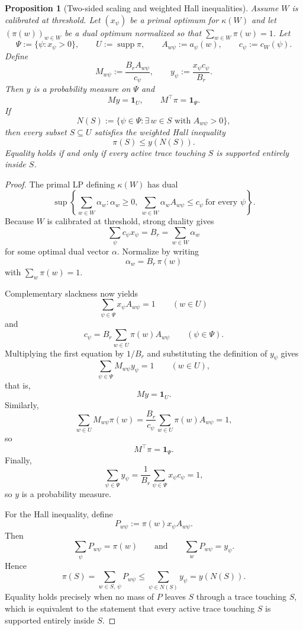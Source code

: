 \documentclass[11pt]{article}
\newtheorem{proposition}[theorem]{Proposition}
\theoremstyle{definition}
\newcommand{\supp}{\operatorname{supp}}
\newcommand{\1}{\mathbf{1}}
\begin{document}
\begin{proposition}[Two-sided scaling and weighted Hall inequalities]\label{prop:calibrated-blocker-scaling}
Assume $W$ is calibrated at threshold. Let $(x_\psi)$ be a primal optimum for $\kappa(W)$ and let $(\pi(w))_{w\in W}$ be a dual optimum normalized so that $\sum_{w\in W}\pi(w)=1$. Let
\[
\Psi:=\{\psi:x_\psi>0\},
\qquad
U:=\supp \pi,
\qquad
A_{w\psi}:=a_\psi(w),
\qquad
c_\psi:=c_W(\psi).
\]
Define
\[
M_{w\psi}:=\frac{B_r A_{w\psi}}{c_\psi},
\qquad
y_\psi:=\frac{x_\psi c_\psi}{B_r}.
\]
Then $y$ is a probability measure on $\Psi$ and
\[
My=\mathbf 1_U,
\qquad
M^\top \pi=\mathbf 1_\Psi.
\]
If
\[
N(S):=\{\psi\in\Psi:\exists\, w\in S \text{ with }A_{w\psi}>0\},
\]
then every subset $S\subseteq U$ satisfies the weighted Hall inequality
\[
\pi(S)\le y(N(S)).
\]
Equality holds if and only if every active trace touching $S$ is supported entirely inside $S$.
\end{proposition}

\begin{proof}
The primal LP defining $\kappa(W)$ has dual
\[
\sup\left\{
\sum_{w\in W}\alpha_w:
\alpha_w\ge 0,\ 
\sum_{w\in W}\alpha_w A_{w\psi}\le c_\psi \ \text{for every }\psi
\right\}.
\]
Because $W$ is calibrated at threshold, strong duality gives
\[
\sum_{\psi} c_\psi x_\psi = B_r = \sum_{w\in W}\alpha_w
\]
for some optimal dual vector $\alpha$. Normalize by writing
\[
\alpha_w=B_r\,\pi(w)
\]
with $\sum_w \pi(w)=1$.

Complementary slackness now yields
\[
\sum_{\psi\in\Psi} x_\psi A_{w\psi}=1
\qquad (w\in U)
\]
and
\[
c_\psi=B_r\sum_{w\in U}\pi(w)A_{w\psi}
\qquad (\psi\in \Psi).
\]
Multiplying the first equation by $1/B_r$ and substituting the definition of $y_\psi$ gives
\[
\sum_{\psi\in \Psi} M_{w\psi} y_\psi =1
\qquad (w\in U),
\]
that is,
\[
My=\mathbf 1_U.
\]
Similarly,
\[
\sum_{w\in U} M_{w\psi}\pi(w)
=
\frac{B_r}{c_\psi}\sum_{w\in U}\pi(w)A_{w\psi}
=1,
\]
so
\[
M^\top \pi=\mathbf 1_\Psi.
\]
Finally,
\[
\sum_{\psi\in\Psi} y_\psi
=
\frac{1}{B_r}\sum_{\psi\in\Psi} x_\psi c_\psi
=
1,
\]
so $y$ is a probability measure.

For the Hall inequality, define
\[
P_{w\psi}:=\pi(w)x_\psi A_{w\psi}.
\]
Then
\[
\sum_{\psi} P_{w\psi}=\pi(w)
\qquad\text{and}\qquad
\sum_w P_{w\psi}=y_\psi.
\]
Hence
\[
\pi(S)=\sum_{w\in S,\ \psi} P_{w\psi}
\le
\sum_{\psi\in N(S)} y_\psi
=
y(N(S)).
\]
Equality holds precisely when no mass of $P$ leaves $S$ through a trace touching $S$, which is equivalent to the statement that every active trace touching $S$ is supported entirely inside $S$.
\end{proof}
\end{document}

